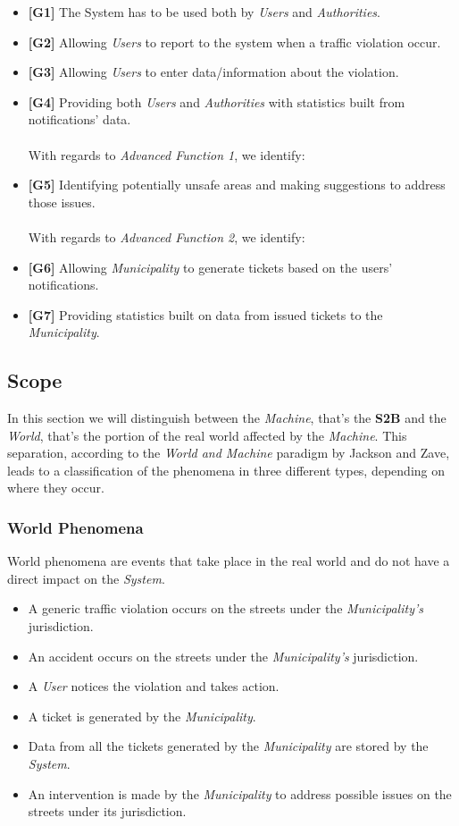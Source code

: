 \documentclass {article}
\begin{document}
		\begin{itemize}
			 \item {\bf [G1]} The System has to be used both by {\it Users} and {\it Authorities}.
   			 \item {\bf [G2]} Allowing {\it Users} to report to the system when a traffic violation occur.		
			 \item {\bf [G3]} Allowing {\it Users} to enter data/information about the violation.
   			 \item {\bf [G4]} Providing both {\it Users} and {\it Authorities} with statistics built from notifications’ data.    			  
   			 \\
			 \\
With regards to {\it {\it Advanced Function 1}}, we identify: 
   			 \item {\bf [G5]} Identifying potentially unsafe areas and making suggestions to address those issues.
   			 \\
			 \\
 With regards to {\it Advanced Function 2}, we identify:
			  \item {\bf [G6]} Allowing {\it Municipality} to generate tickets based on the users’ notifications. 
			  \item {\bf [G7]} Providing statistics built on data from issued tickets to the {\it Municipality}.		
			  \end{itemize}
			
	\subsection{Scope}
	In this section we will distinguish between the {\it Machine}, that's the {\bf S2B} and the {\it World}, that's the portion of the real world affected by the {\it Machine}. This separation, according to the {\it World and Machine} paradigm by Jackson and Zave, leads to a classification of the phenomena in three different types, depending on where they occur. 		
		\subsubsection{World Phenomena}
		World phenomena are events that take place in the real world and do not have a direct impact on the {\it System}. 
		\begin{itemize}
			\item A generic traffic violation occurs on the streets under the {\it Municipality's} jurisdiction. 
			\item An accident occurs on the streets under the {\it Municipality's} jurisdiction.
			\item A {\it User} notices the violation and takes action.
			\item A ticket is generated by the {\it Municipality}.
			\item Data from all the tickets generated by the {\it Municipality} are stored by the {\it System}.
			\item An intervention is made by the {\it Municipality} to address possible issues on the streets under its jurisdiction.
		\end{itemize}
\end{document}
